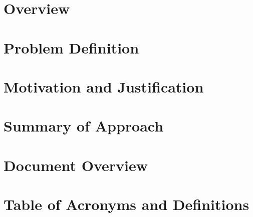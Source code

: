 
\newcommand*{\intro}{chapters/introduction/}

\section{Overview}
	
\section{Problem Definition}
	
\section{Motivation and Justification}
	
\section{Summary of Approach}
	
\section{Document Overview}
	
\section[Acronyms]{Table of Acronyms and Definitions}
	
